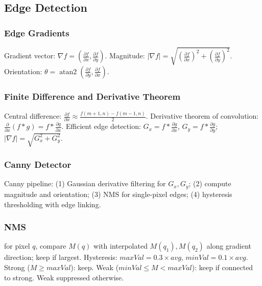 \subsection{Edge Detection}
\subsubsection*{Edge Gradients}
Gradient vector: $\nabla f=(\frac{\partial f}{\partial x},\frac{\partial f}{\partial y})$.
Magnitude: $|\nabla f|=\sqrt{(\frac{\partial f}{\partial x})^2+(\frac{\partial f}{\partial y})^2}$.
Orientation: $\theta=\operatorname{atan2}(\frac{\partial f}{\partial y},\frac{\partial f}{\partial x})$.

\subsubsection*{Finite Difference and Derivative Theorem}
Central difference: $\frac{\partial f}{\partial x}\approx\frac{f(m+1,n)-f(m-1,n)}{2}$.
Derivative theorem of convolution: $\frac{\partial}{\partial x}(f*g)=f*\frac{\partial g}{\partial x}$.
Efficient edge detection: $G_x=f*\frac{\partial g}{\partial x}$, $G_y=f*\frac{\partial g}{\partial y}$; $|\nabla f|=\sqrt{G_x^2+G_y^2}$.

\subsubsection*{Canny Detector}
Canny pipeline: (1) Gaussian derivative filtering for $G_x,G_y$; (2) compute magnitude and orientation; (3) NMS for single-pixel edges; (4) hysteresis thresholding with edge linking.

\subsubsection*{NMS}
for pixel $q$, compare $M(q)$ with interpolated $M(q_1),M(q_2)$ along gradient direction; keep if largest.
Hysteresis: $maxVal=0.3\times avg$, $minVal=0.1\times avg$. Strong ($M\ge maxVal$): keep. Weak ($minVal\le M<maxVal$): keep if connected to strong. Weak suppressed otherwise.
